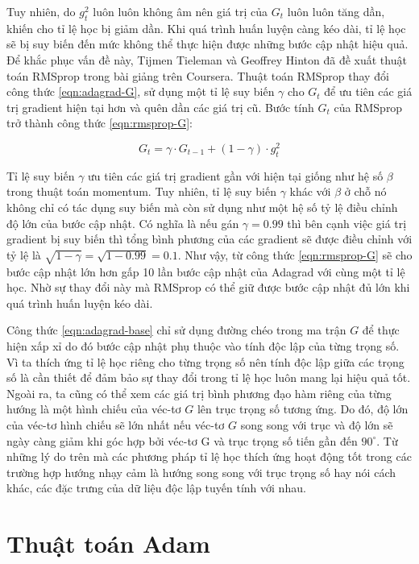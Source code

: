 Tuy nhiên, do $g^{2}_{t}$ luôn luôn không âm nên giá trị của $G_t$ luôn luôn tăng dần, khiến cho tỉ lệ học bị giảm dần. Khi quá trình huấn luyện càng kéo dài, tỉ lệ học sẽ bị suy biến đến mức không thể thực hiện được những bước cập nhật hiệu quả. Để khắc phục vấn đề này, Tijmen Tieleman và Geoffrey Hinton đã đề xuất thuật toán RMSprop trong bài giảng trên Coursera\cite{tieleman2012rmsprop}. Thuật toán RMSprop thay đổi công thức \ref{eqn:adagrad-G}, sử dụng một tỉ lệ suy biến $\gamma$ cho $G_t$ để ưu tiên các giá trị gradient hiện tại hơn và quên dần các giá trị cũ. Bước tính $G_t$ của RMSprop trở thành công thức \ref{eqn:rmsprop-G}:

\begin{equation}
	\label{eqn:rmsprop-G}
	G_{t} = \gamma \cdot G_{t-1} + (1-\gamma) \cdot g^{2}_t
\end{equation}

Tỉ lệ suy biến $\gamma$ ưu tiên các giá trị gradient gần với hiện tại giống như hệ số $\beta$ trong thuật toán momentum. Tuy nhiên, tỉ lệ suy biến $\gamma$ khác với $\beta$ ở chỗ nó không chỉ có tác dụng suy biến mà còn sử dụng như một hệ số tỷ lệ điều chỉnh độ lớn của bước cập nhật. Có nghĩa là nếu gán $\gamma = 0.99$ thì bên cạnh việc giá trị gradient bị suy biến thì tổng bình phương của các gradient sẽ được điều chỉnh với tỷ lệ là $\sqrt{1-\gamma} = \sqrt{1 - 0.99} = 0.1$. Như vậy, từ công thức \ref{eqn:rmsprop-G} sẽ cho bước cập nhật lớn hơn gấp 10 lần bước cập nhật của Adagrad với cùng một tỉ lệ học. Nhờ sự thay đổi này mà RMSprop có thể giữ được bước cập nhật đủ lớn khi quá trình huấn luyện kéo dài.

Công thức \ref{eqn:adagrad-base} chỉ sử dụng đường chéo trong ma trận $G$ để thực hiện xấp xỉ do đó bước cập nhật phụ thuộc vào tính độc lập của từng trọng số. Vì ta thích ứng tỉ lệ học riêng cho từng trọng số nên tính độc lập giữa các trọng số là cần thiết để đảm bảo sự thay đổi trong tỉ lệ học luôn mang lại hiệu quả tốt. Ngoài ra, ta cũng có thể xem các giá trị bình phương đạo hàm riêng của từng hướng là một hình chiếu của véc-tơ $G$ lên trục trọng số tương ứng. Do đó, độ lớn của véc-tơ hình chiếu sẽ lớn nhất nếu véc-tơ $G$ song song với trục và độ lớn sẽ ngày càng giảm khi góc hợp bởi véc-tơ G và trục trọng số tiến gần đến $90^\circ$. Từ những lý do trên mà các phương pháp tỉ lệ học thích ứng hoạt động tốt trong các trường hợp hướng nhạy cảm là hướng song song với trục trọng số hay nói cách khác, các đặc trưng của dữ liệu độc lập tuyến tính với nhau.

\section{Thuật toán Adam}

